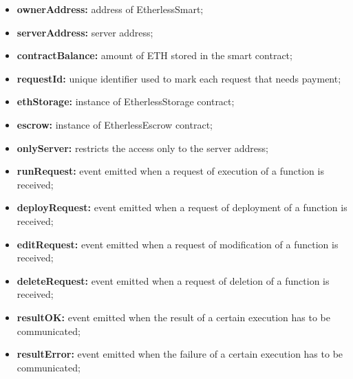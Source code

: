 	\begin{itemize}
		\item \textbf{ownerAddress:} address of EtherlessSmart;
		\item \textbf{serverAddress:} server address;
		\item \textbf{contractBalance:} amount of ETH stored in the smart contract;
		\item \textbf{requestId:} unique identifier used to mark each request that needs payment;
		\item \textbf{ethStorage:} instance of EtherlessStorage contract;
		\item \textbf{escrow:} instance of EtherlessEscrow contract;
	\end{itemize}
	\begin{itemize}
		\item \textbf{onlyServer:} restricts the access only to the server address;
	\end{itemize}
	\begin{itemize}
		\item \textbf{runRequest:} event emitted when a request of execution of a function is received;
		\item \textbf{deployRequest:} event emitted when a request of deployment of a function is received;
		\item \textbf{editRequest:} event emitted when a request of modification of a function is received;
		\item \textbf{deleteRequest:} event emitted when a request of deletion of a function is received;
		\item \textbf{resultOK:} event emitted when the result of a certain execution has to be communicated;
		\item \textbf{resultError:} event emitted when the failure of a certain execution has to be communicated;
	\end{itemize}
